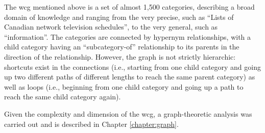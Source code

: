 The \gls{wcg} mentioned above is a set of almost 1,500 categories, describing a broad domain of knowledge and ranging from the very precise, such as ``Lists of Canadian network television schedules”, to the very general, such as ``information”. The categories are connected by hypernym relationships, with a child category having an ``subcategory-of” relationship to its parents in the direction of the relationship. However, the graph is not strictly hierarchic: shortcuts exist in the connections (i.e., starting from one child category and going up two different paths of different lengths to reach the same parent category) as well as loops (i.e., beginning from one child category and going up a path to reach the same child category again).

Given the complexity and dimension of the \gls{wcg}, a graph-theoretic analysis was carried out and is described in Chapter \ref{chapter:graph}. 
